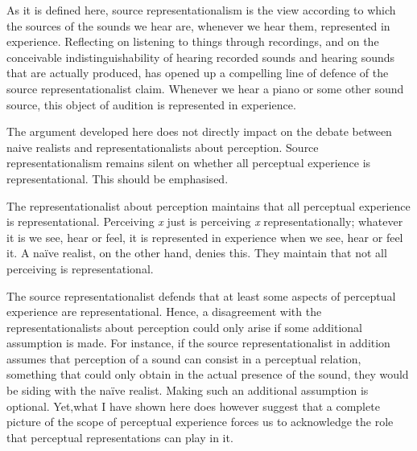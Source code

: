 \documentclass[sloppy, journal, git, bytitle, dodraft]{humapap}
\begin{document}
\sect As it is defined here, source representationalism is the view according
to which the sources of the sounds we hear are, whenever we hear them,
represented in experience. Reflecting on listening to things through
recordings, and on the conceivable indistinguishability of hearing
recorded sounds and hearing sounds that are actually produced, has
opened up a compelling line of defence of the source representationalist
claim. Whenever we hear a piano or some other sound source, this object
of audition is represented in experience.


\sect The argument developed here does not directly impact on the debate
between naive realists and representationalists about perception. Source
representationalism remains silent on whether all perceptual experience
is representational. This should be emphasised.

The representationalist about perception maintains that all perceptual
experience is representational. Perceiving \emph{x} just is perceiving
\emph{x} representationally; whatever it is we see, hear or feel, it is
represented in experience when we see, hear or feel it. A naïve realist,
on the other hand, denies this. They maintain that not all perceiving is
representational.

The source representationalist defends that at least some aspects of
perceptual experience are representational. Hence, a disagreement with
the representationalists about perception could only arise if some
additional assumption is made. For instance, if the source
representationalist in addition assumes that perception of a sound can
consist in a perceptual relation, something that could only obtain in
the actual presence of the sound, they would be siding with the naïve
realist. Making such an additional assumption is optional. Yet,what I
have shown here does however suggest that a complete picture of the
scope of perceptual experience forces us to acknowledge the role that
perceptual representations can play in it.

\printbibliography
\end{document}
